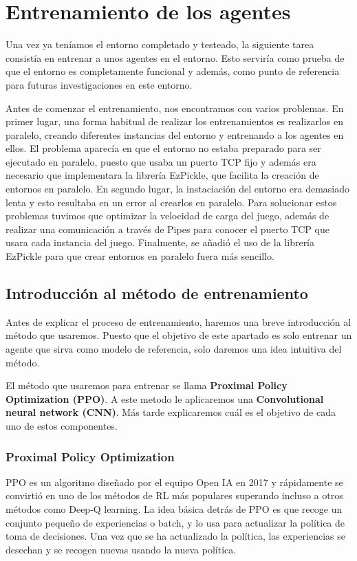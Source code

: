 \chapter{Entrenamiento de los agentes}

Una vez ya teníamos el entorno completado y testeado, la siguiente tarea consistía en entrenar a unos agentes en el entorno. Esto serviría como prueba de que el entorno es completamente funcional y además, como punto de referencia para futuras investigaciones en este entorno.

Antes de comenzar el entrenamiento, nos encontramos con varios problemas. En primer lugar, una forma habitual de realizar los entrenamientos es realizarlos en paralelo, creando diferentes instancias del entorno y entrenando a los agentes en ellos. El problema aparecía en que el entorno no estaba preparado para ser ejecutado en paralelo, puesto que usaba un puerto TCP fijo y además era necesario que implementara la librería EzPickle, que facilita la creación de entornos en paralelo. En segundo lugar, la instaciación del entorno era demasiado lenta y esto resultaba en un error al crearlos en paralelo. Para solucionar estos problemas tuvimos que optimizar la velocidad de carga del juego, además de realizar una comunicación a través de Pipes para conocer el puerto TCP que usara cada instancia del juego. Finalmente, se añadió el uso de la librería EzPickle para que crear entornos en paralelo fuera más sencillo.

\section{Introducción al método de entrenamiento}

Antes de explicar el proceso de entrenamiento, haremos una breve introducción al método que usaremos. Puesto que el objetivo de este apartado es solo entrenar un agente que sirva como modelo de referencia, solo daremos una idea intuitiva del método.

El método que usaremos para entrenar se llama \textbf{Proximal Policy Optimization (PPO)}. A este metodo le aplicaremos una \textbf{Convolutional neural network (CNN)}. Más tarde explicaremos cuál es el objetivo de cada uno de estos componentes.

\subsection*{Proximal Policy Optimization}

PPO es un algoritmo diseñado por el equipo Open IA en 2017 y rápidamente se convirtió en uno de los métodos de RL más populares superando incluso a otros métodos como Deep-Q learning. La idea básica detrás de PPO es que recoge un conjunto pequeño de experiencias o batch, y lo usa para actualizar la política de toma de decisiones. Una vez que se ha actualizado la política, las experiencias se desechan y se recogen nuevas usando la nueva política.

